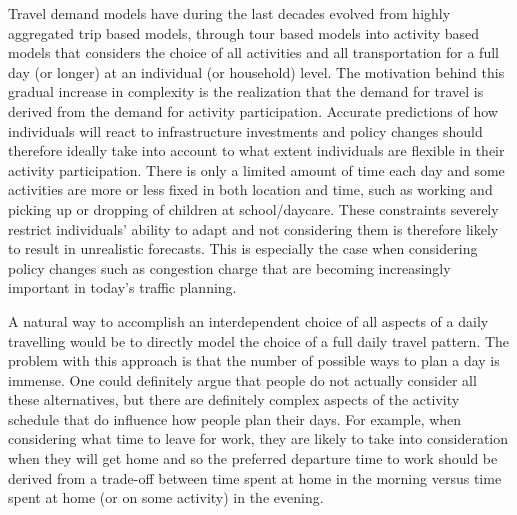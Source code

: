 Travel demand models have during the last decades evolved from highly aggregated trip based models, through tour based models into activity based models that considers the choice of all activities and all transportation for a full day (or longer) at an individual (or household) level. The motivation behind this gradual increase in complexity is the realization that the demand for travel is derived from the demand for activity participation. Accurate predictions of how individuals will react to infrastructure investments and policy changes should therefore ideally take into account to what extent individuals are flexible in their activity participation. There is only a limited amount of time each day and some activities are more or less fixed in both location and time, such as working and picking up or dropping of children at school/daycare. These constraints severely restrict individuals' ability to adapt and not considering them is therefore likely to result in unrealistic forecasts. This is especially the case when considering policy changes such as congestion charge that are becoming increasingly important in today's traffic planning. 

A natural way to accomplish an interdependent choice of all aspects of a daily travelling would be to directly model the choice of a full daily travel pattern.
The problem with this approach is that the number of possible ways to plan a day is immense. One could definitely argue that people do not actually consider all these alternatives, but there are definitely complex aspects of the activity schedule that do influence how people plan their days. For example, when considering what time to leave for work, they are likely to take into consideration when they will get home and so the preferred departure time to work should be derived from a trade-off between time spent at home in the morning versus time spent at home (or on some activity) in the evening.

